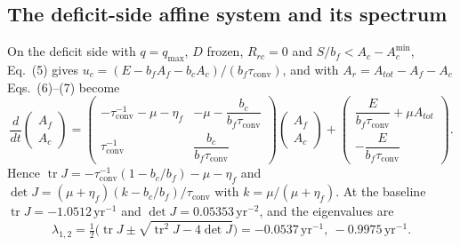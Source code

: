 \documentclass[11pt,a4paper]{article}
\newcommand{\Acmin}{A_c^{\min}}
\newcommand{\tconv}{\tau_{\mathrm{conv}}}
\begin{document}
\subsection{The deficit-side affine system and its spectrum}\label{si:affine}

On the deficit side with $q=q_{\max}$, $D$ frozen, $R_{rc}=0$ and $S/b_f<A_c-\Acmin$, Eq.~(5) gives $u_c=(E-b_fA_f-b_cA_c)/(b_f\tconv)$, and with $A_r=A_{tot}-A_f-A_c$ Eqs.~(6)--(7) become
\begin{equation}
\frac{d}{dt}\begin{pmatrix}A_f\\A_c\end{pmatrix}=
\begin{pmatrix}-\tconv^{-1}-\mu-\eta_f & -\mu-\dfrac{b_c}{b_f\tconv}\\[8pt]\tconv^{-1} & \dfrac{b_c}{b_f\tconv}\end{pmatrix}
\begin{pmatrix}A_f\\A_c\end{pmatrix}+
\begin{pmatrix}\dfrac{E}{b_f\tconv}+\mu A_{tot}\\[8pt]-\dfrac{E}{b_f\tconv}\end{pmatrix}.
\end{equation}
Hence $\operatorname{tr}J=-\tconv^{-1}(1-b_c/b_f)-\mu-\eta_f$ and $\det J=(\mu+\eta_f)(k-b_c/b_f)/\tconv$ with $k=\mu/(\mu+\eta_f)$. At the baseline $\operatorname{tr}J=-1.0512\,\mathrm{yr}^{-1}$ and $\det J=0.05353\,\mathrm{yr}^{-2}$, and the eigenvalues are
\begin{equation}
\lambda_{1,2}=\tfrac12\Big(\operatorname{tr}J\pm\sqrt{\operatorname{tr}^2J-4\det J}\Big)=-0.0537\,\mathrm{yr}^{-1},\ -0.9975\,\mathrm{yr}^{-1}.
\end{equation}
\end{document}
